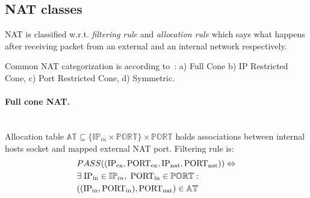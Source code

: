 \documentclass[twoside]{article}
\begin{document}
\begin{multicols}{2}
% 
% 

\subsection{NAT classes}
NAT is classified w.r.t. \emph{filtering rule} and \emph{allocation rule} which says what happens after receiving
packet from an external and an internal network respectively.

Common NAT categorization is according to~\citep{rfc3489}: a) Full Cone
b) IP Restricted Cone, c) Port Restricted Cone, d) Symmetric.

\paragraph{Full cone NAT.} ~\\
Allocation table $\mathbb{AT} \subseteq \{ \mathbb{IP}_{in} \times \mathbb{PORT} \} \times \mathbb{PORT}$ holds associations between internal 
hosts socket and mapped external NAT port. 
Filtering rule is:
\begin{align*}
& PASS((\text{IP\textsubscript{ex}}, \text{PORT\textsubscript{ex}}, \text{IP\textsubscript{nat}}, \text{PORT\textsubscript{nat}} )) \Leftrightarrow \\
&  \exists \; \text{IP\textsubscript{in}} \in \mathbb{IP}_{in}, \; \text{PORT\textsubscript{in}} \in \mathbb{PORT}:\\
& ((\text{IP\textsubscript{in}}, \text{PORT\textsubscript{in}}), \text{PORT\textsubscript{nat}} ) \in \mathbb{AT}
\end{align*}
 

\end{multicols}
\end{document}
